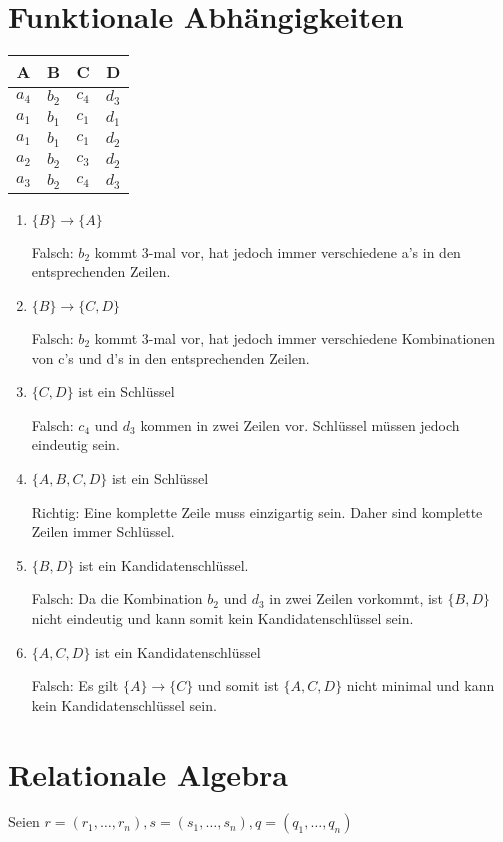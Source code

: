 \documentclass{scrartcl}
\begin{document}
\section{Funktionale Abhängigkeiten}
\begin{center}
\begin{tabular}{|c|c|c|c|}
    \hline
    A & B & C & D\\
    \hline\hline
    $a_4$ & $b_2$ & $c_4$ & $d_3$\\
    \hline
    $a_1$ & $b_1$ & $c_1$ & $d_1$\\
    \hline
    $a_1$ & $b_1$ & $c_1$ & $d_2$\\
    \hline
    $a_2$ & $b_2$ & $c_3$ & $d_2$\\
    \hline
    $a_3$ & $b_2$ & $c_4$ & $d_3$ \\
    \hline
\end{tabular}    
\end{center}
\begin{enumerate}
\item $\{B\} \to \{A\}$

Falsch: $b_2$ kommt 3-mal vor, hat jedoch immer verschiedene a's in den entsprechenden Zeilen.
\item $\{B\} \to \{C, D\}$

Falsch: $b_2$ kommt 3-mal vor, hat jedoch immer verschiedene Kombinationen von c's und d's in den entsprechenden Zeilen.
\item $\{C, D\}$ ist ein Schlüssel

Falsch: $c_4$ und $d_3$ kommen in zwei Zeilen vor. Schlüssel müssen jedoch eindeutig sein.
\item $\{A, B, C, D\}$ ist ein Schlüssel

Richtig: Eine komplette Zeile muss einzigartig sein. Daher sind komplette Zeilen immer Schlüssel.
\item $\{B, D\}$ ist ein Kandidatenschlüssel.

Falsch: Da die Kombination $b_2$ und $d_3$ in zwei Zeilen vorkommt, ist $\{B, D\}$ nicht eindeutig und kann somit kein Kandidatenschlüssel sein.
\item $\{A, C, D\}$ ist ein Kandidatenschlüssel

Falsch: Es gilt $\{ A\} \to \{ C\}$ und somit ist $\{A, C, D\}$ nicht minimal und kann kein Kandidatenschlüssel sein.
\end{enumerate}

\section{Relationale Algebra}
Seien $r = (r_1,\ldots,r_n), s = (s_1, \ldots, s_n), q = (q_1, \ldots, q_n)$
\end{document}
